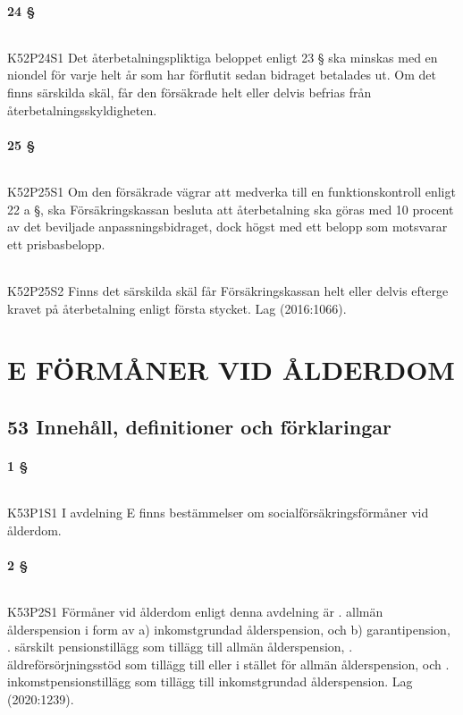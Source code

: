 \documentclass[a4paper,notitlepage,openany,10pt]{book}
\begin{document}
\subsection*{24 §}
\paragraph*{}
{\tiny K52P24S1}
Det återbetalningspliktiga beloppet enligt 23 § ska minskas med en niondel för varje helt år som har förflutit sedan bidraget betalades ut. Om det finns särskilda skäl, får den försäkrade helt eller delvis befrias från återbetalningsskyldigheten.
\subsection*{25 §}
\paragraph*{}
{\tiny K52P25S1}
Om den försäkrade vägrar att medverka till en funktionskontroll enligt 22 a §, ska Försäkringskassan besluta att återbetalning ska göras med 10 procent av det beviljade anpassningsbidraget, dock högst med ett belopp som motsvarar ett prisbasbelopp.
\paragraph*{}
{\tiny K52P25S2}
Finns det särskilda skäl får Försäkringskassan helt eller delvis efterge kravet på återbetalning enligt första stycket.
Lag (2016:1066).
\part*{E FÖRMÅNER VID ÅLDERDOM}
\chapter*{53 Innehåll, definitioner och förklaringar}
\subsection*{1 §}
\paragraph*{}
{\tiny K53P1S1}
I avdelning E finns bestämmelser om socialförsäkringsförmåner vid ålderdom.
\subsection*{2 §}
\paragraph*{}
{\tiny K53P2S1}
Förmåner vid ålderdom enligt denna avdelning är
. allmän ålderspension i form av
a) inkomstgrundad ålderspension, och
b) garantipension,
. särskilt pensionstillägg som tillägg till allmän ålderspension,
. äldreförsörjningsstöd som tillägg till eller i stället för allmän ålderspension, och
. inkomstpensionstillägg som tillägg till inkomstgrundad ålderspension.
Lag (2020:1239).
\end{document}
